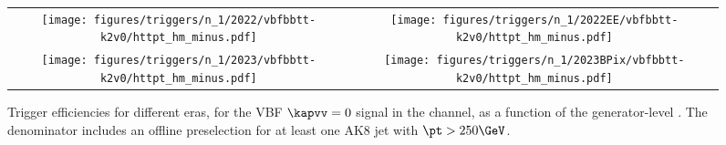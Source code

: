 
    \begin{figure}[H]
        \centering
        \begin{tabular}{cc}
            \texttt{[image: figures/triggers/n\_1/2022/vbfbbtt-k2v0/httpt\_hm\_minus.pdf]} &
            \texttt{[image: figures/triggers/n\_1/2022EE/vbfbbtt-k2v0/httpt\_hm\_minus.pdf]} \\[1ex]
            \texttt{[image: figures/triggers/n\_1/2023/vbfbbtt-k2v0/httpt\_hm\_minus.pdf]} &
            \texttt{[image: figures/triggers/n\_1/2023BPix/vbfbbtt-k2v0/httpt\_hm\_minus.pdf]}
            \label{fig}
        \end{tabular}
\caption{Trigger efficiencies for different eras, for the VBF \HHbbtt $\kapvv=0$ signal in the \tauhm channel, as a function of the generator-level \htata \pt. The denominator includes an offline preselection for at least one AK8 jet with $\pt > 250\GeV$.}
\label{fig:triggers_n-1_vbfbbtt-k2v0_hm_httpt}
\end{figure}
